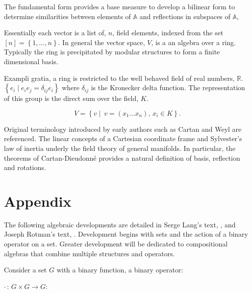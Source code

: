 \documentclass[aps,twocolumn,secnumarabic,nobalancelastpage,amsmath,amssymb,
nofootinbib,parskip=full]{revtex4}
\begin{document}
The fundamental form provides a base measure to develop a bilinear form to
determine similarities between elements of $\mathbb{A}$
and reflections in subspaces of $\mathbb{A}$, 

\begin{itemize}
\item \textbf{\small (Bilinear Form)} $\langle x,y\rangle={1\over 2}(\Phi (x-y)-\Phi(x)-\Phi(y)})$ 
\end{itemize}



Essentially each vector is a list of, $n$, field elements,
indexed from the set $\left[n\right]=\left\{1,\dots,n\right\}$.
In general the vector space, $V$, is a an algebra over a ring.
Typically the ring is precipitated by modular structures
to form a finite dimensional basis. 

Exampli gratia, a ring is restricted to the well behaved field of
real numbers, $\mathbb{R}$. 
$\left\{e_i\mid e_ie_j=\delta_{ij}e_i\right\}$ where $\delta_{ij}$ is the Kronecker delta function.
The representation of this group is the direct sum over the field, $K$.

\begin{equation}
V = \left\{v\mid\ v=\left(x_1\dots x_n\right),\,x_i\in K\right\}.
\end{equation}


Original terminology introduced by early authors such as Cartan and Weyl are referenced.
The linear concepts of a Cartesian coordinate frame and Sylvester's law of inertia underly
the field theory of general manifolds. In particular, the theorems of
Cartan-Dieudonn\'{e} provides a natural definition of basis, reflection and rotations.

\section{Appendix}

The following algebraic developments are detailed in Serge Lang's text, 
\cite{lang2002}, and Joseph Rotman's text, \cite{rotman1998}. 
Development begins with sets and the action of a binary operator on a set.
Greater development will be dedicated to compositional algebras that
combine multiple structures and operators.

Consider a set $G$ with a binary function, a binary operator:
\begin{center}
$\cdot\, {:}\, G \times G \to G$:
\end{center}
\end{document}
